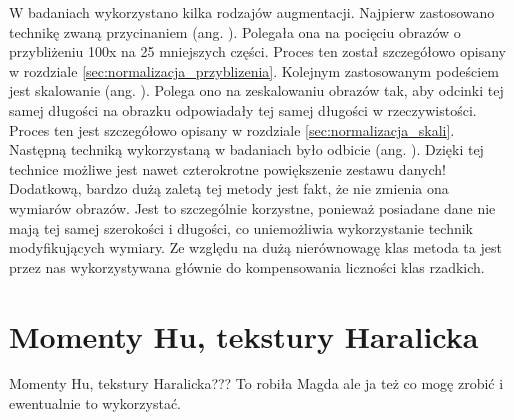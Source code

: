 W badaniach wykorzystano kilka rodzajów augmentacji. Najpierw zastosowano technikę zwaną przycinaniem (ang. ). Polegała ona na pocięciu obrazów o przybliżeniu 100x na 25 mniejszych części. Proces ten został szczegółowo opisany w rozdziale \ref{sec:normalizacja_przyblizenia}. Kolejnym zastosowanym podeściem jest skalowanie (ang. ).  Polega ono na zeskalowaniu obrazów tak, aby odcinki tej samej długości na obrazku odpowiadały tej samej długości w rzeczywistości. Proces ten jest szczegółowo opisany w rozdziale \ref{sec:normalizacja_skali}. Następną techniką wykorzystaną w badaniach było odbicie (ang. ). Dzięki tej technice możliwe jest nawet czterokrotne powiększenie zestawu danych! Dodatkową, bardzo dużą zaletą tej metody jest fakt, że nie zmienia ona wymiarów obrazów. Jest to szczególnie korzystne, ponieważ posiadane  dane nie mają tej samej szerokości i długości, co uniemożliwia wykorzystanie technik modyfikujących wymiary. Ze względu na dużą nierównowagę klas metoda ta jest przez nas wykorzystywana głównie do kompensowania liczności klas rzadkich.


\section{Momenty Hu, tekstury Haralicka}
\label{sec:Momenty Hu, tekstury Haralicka}

Momenty Hu, tekstury Haralicka??? To robiła Magda ale ja też co mogę zrobić i ewentualnie to wykorzystać.














